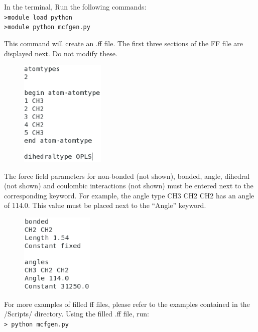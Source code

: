 In the terminal, Run the following commands:\\
\texttt{>module load python} \\
\texttt{>module python mcfgen.py}

This command will create an .ff file. The first three sections of the FF file are displayed next. 
Do not modify these.

\begin{figure}[h]
\begin{center}
\includegraphics[height=2in]{top_ff.eps}
\end{center}
\end{figure}

The force field parameters for non-bonded (not shown), bonded, angle, dihedral (not shown)
and coulombic interactions (not shown) must be entered next to the corresponding keyword.
For example, the angle type CH3 CH2 CH2 has an angle of 114.0. This value must be placed
next to the ``Angle'' keyword. 

\begin{figure}[h]
\begin{center}
\includegraphics[height=1.5in]{body_ff.eps}
\end{center}
\end{figure}

\vspace{3in}
For more examples of filled ff files, please refer to the examples contained in the /Scripts/ directory. Using the 
filled .ff file, run: \\

\texttt{> python mcfgen.py} \\

